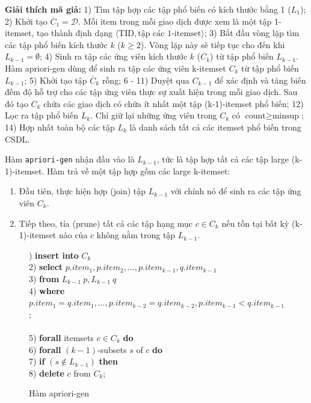 \documentclass[12pt]{article}
\begin{document}
\textbf{Giải thích mã giả:}
1) Tìm tập hợp các tập phổ biến có kích thước bằng 1 ($L_1$);
2) Khởi tạo $\overline{C}_1 = \mathcal{D}$. Mỗi item trong mỗi giao dịch được xem là một tập 1-itemset, tạo thành định dạng $\langle \text{TID}, \text{tập các 1-itemset} \rangle$;
3) Bắt đầu vòng lặp tìm các tập phổ biến kích thước $k$ ($k\geq2$). Vòng lặp này sẽ tiếp tục cho đến khi $L_{k-1} = \emptyset$;
4) Sinh ra tập các ứng viên kích thước $k$ ($C_k$) từ tập phổ biến $L_{k-1}$. Hàm apriori-gen dùng để sinh ra tập các ứng viên k-itemset $C_k$ từ tập phổ biến $L_{k-1}$;
5) Khởi tạo tập $\overline{C}_k$ rỗng;
6 - 11)  Duyệt qua $C_{k-1}$ để xác định và tăng biến đếm độ hỗ trợ cho các tập ứng viên thực sự xuất hiện trong mỗi giao dịch. Sau đó tạo $C_k$ chứa các giao dịch có chứa ít nhất một tập (k-1)-itemset phổ biến;
12) Lọc ra tập phổ biến $L_k$. Chỉ giữ lại những ứng viên trong $C_k$ có $\text{count} \geq \text{minsup}$;
14) Hợp nhất toàn bộ các tập $L_k$ là danh sách tất cả các itemset phổ biến trong CSDL.

Hàm \texttt{apriori-gen} nhận đầu vào là $L_{k-1}$, tức là tập hợp tất cả các tập large (k-1)-itemset. Hàm trả về một tập hợp gồm các large k-itemset:

\begin{enumerate}
    \item Đầu tiên, thực hiện hợp (join) tập $L_{k-1}$ với chính nó để sinh ra các tập ứng viên $C_k$.
    \item Tiếp theo, tỉa (prune) tất cả các tập hạng mục $c \in C_k$ nếu tồn tại bất kỳ (k-1)-itemset nào của $c$ không nằm trong tập $L_{k-1}$.
\end{enumerate}

\begin{figure}[h]
    ) \hspace*{0.3em} \textbf{insert into} $C_k$ \\
    2) \hspace*{0.3em} \textbf{select} $p.item_1, p.item_2, \ldots, p.item_{k-1}, q.item_{k-1}$ \\
    3) \hspace*{0.3em} \textbf{from} $L_{k-1} \ p, L_{k-1} \ q$ \\
    4) \hspace*{0.3em} \textbf{where} $p.item_1 = q.item_1, \ldots, p.item_{k-2} = q.item_{k-2}, p.item_{k-1} < q.item_{k-1}$; \\
    \\
    5) \hspace*{0.3em} \textbf{forall} itemsets $c \in C_k$ \textbf{do} \\
    6) \hspace*{1.5em} \textbf{forall} $(k-1)$-subsets $s$ of $c$ \textbf{do} \\
    7) \hspace*{3em} \textbf{if} $(s \notin L_{k-1})$ \textbf{then} \\
    8) \hspace*{4.2em} \textbf{delete} $c$ from $C_k$;
    \caption{Hàm apriori-gen}
    \label{fig:apriori-gen}
\end{figure}
\end{document}
